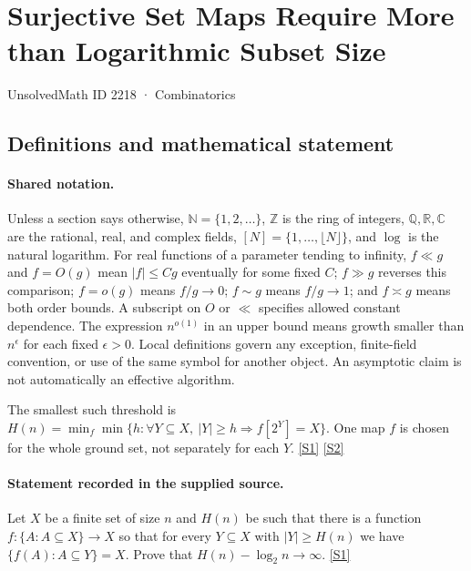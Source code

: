 \documentclass[11pt,a4paper]{article}
\newcommand{\N}{\mathbb{N}}
\newcommand{\Z}{\mathbb{Z}}
\newcommand{\Q}{\mathbb{Q}}
\newcommand{\R}{\mathbb{R}}
\newcommand{\C}{\mathbb{C}}
\newcommand{\sref}[2]{\hyperlink{source:#1:#2}{[S#2]}}
\begin{document}

\setcounter{section}{2217}

\section{Surjective Set Maps Require More than Logarithmic Subset Size}\label{2218}

{\small\sffamily UnsolvedMath ID 2218 · Combinatorics}

\subsection{Definitions and mathematical statement}

\paragraph{Shared notation.}Unless a section says otherwise, $\N=\{1,2,\ldots\}$,
$\Z$ is the ring of integers, $\Q,\R,\C$ are the rational, real, and complex
fields, $[N]=\{1,\ldots,\lfloor N\rfloor\}$, and $\log$ is the natural
logarithm. For real functions of a parameter tending to infinity,
$f\ll g$ and $f=O(g)$ mean $|f|\leq Cg$ eventually for some fixed $C$;
$f\gg g$ reverses this comparison; $f=o(g)$ means $f/g\to0$;
$f\sim g$ means $f/g\to1$; and $f\asymp g$ means both order bounds.
A subscript on $O$ or $\ll$ specifies allowed constant dependence.
The expression $n^{o(1)}$ in an upper bound means growth smaller than
$n^\epsilon$ for each fixed $\epsilon>0$. Local definitions govern any
exception, finite-field convention, or use of the same symbol for another
object. An asymptotic claim is not automatically an effective algorithm.



The smallest such threshold is $H(n)=\min_f\min\{h:\forall Y\subseteq X,\ |Y|\geq h\Rightarrow f[2^Y]=X\}$. One map $f$ is chosen for the whole ground set, not separately for each $Y$. \sref{2218}{1} \sref{2218}{2}

\paragraph{Statement recorded in the supplied source.}
Let $X$ be a finite set of size $n$ and $H(n)$ be such that there is a function $f:\{A : A\subseteq X\}\to X$ so that for every $Y\subseteq X$ with $\lvert Y\rvert \geq H(n)$ we have $ \{ f(A) : A\subseteq Y\}=X. $ Prove that $ H(n)-\log_2 n \to \infty. $ \sref{2218}{1}
\end{document}
